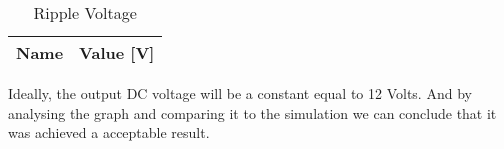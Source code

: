 \begin{table}[H]
  \centering
  \begin{tabular}{|l|r|}
     \hline    
    {\bf Name} & {\bf Value [V]} \\ \hline    
    
  \end{tabular}
  \caption{Ripple Voltage}
  \label{tab:ripple}
\end{table}

Ideally, the output DC voltage will be a constant equal to 12 Volts. And by analysing the graph and comparing it to the simulation we can conclude that it was achieved a acceptable result.
